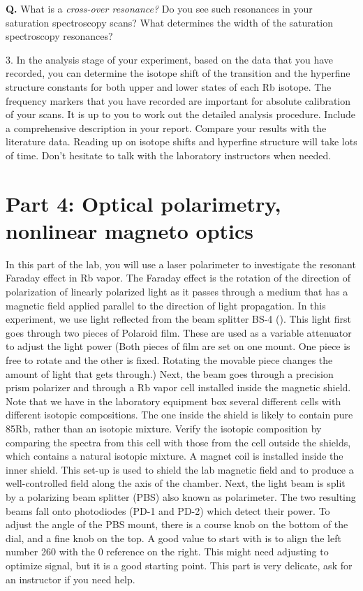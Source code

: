 \documentclass{../lab}
\begin{document}
\textbf{Q.} What is a \emph{cross-over resonance?} Do you see such resonances in your saturation spectroscopy scans? What determines the width of the saturation spectroscopy resonances?

3. In the analysis stage of your experiment, based on the data that you have recorded, you can determine the isotope shift of the transition and the hyperfine structure constants for both upper and lower states of each Rb isotope. The frequency markers that you have recorded are important for absolute calibration of your scans. It is up to you to work out the detailed analysis procedure. Include a comprehensive description in your report. Compare your results with the literature data. Reading up on isotope shifts and hyperfine structure will take lots of time. Don't hesitate to talk with the laboratory instructors when needed.

\section{Part 4: Optical polarimetry, nonlinear magneto optics}

In this part of the lab, you will use a laser polarimeter to investigate the resonant Faraday effect in Rb vapor. The Faraday effect is the rotation of the direction of polarization of linearly polarized light as it passes through a medium that has a magnetic field applied parallel to the direction of light propagation. In this experiment, we use light reflected from the beam splitter BS-4 (). This light first goes through two pieces of Polaroid film. These are used as a variable attenuator to adjust the light power (Both pieces of film are set on one mount. One piece is free to rotate and the other is fixed. Rotating the movable piece changes the amount of light that gets through.) Next, the beam goes through a precision prism polarizer and through a Rb vapor cell installed inside the magnetic shield. Note that we have in the laboratory equipment box several different cells with different isotopic compositions. The one inside the shield is likely to contain pure 85Rb, rather than an isotopic mixture. Verify the isotopic composition by comparing the spectra from this cell with those from the cell outside the shields, which contains a natural isotopic mixture. A magnet coil is installed inside the inner shield. This set-up is used to shield the lab magnetic field and to produce a well-controlled field along the axis of the chamber. Next, the light beam is split by a polarizing beam splitter (PBS) also known as polarimeter. The two resulting beams fall onto photodiodes (PD-1 and PD-2) which detect their power. To adjust the angle of the PBS mount, there is a course knob on the bottom of the dial, and a fine knob on the top. A good value to start with is to align the left number 260 with the 0 reference on the right. This might need adjusting to optimize signal, but it is a good starting point. This part is very delicate, ask for an instructor if you need help.
\end{document}
